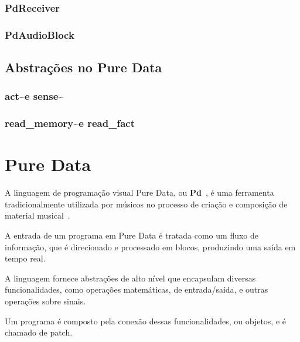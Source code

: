 \documentclass[a4paper, 11pt, twoside]{article}
\begin{document}
\begin{multicols}{2}
\subsubsection{PdReceiver}

\subsubsection{PdAudioBlock}

\subsection{Abstrações no Pure Data}

\subsubsection{act\textasciitilde e sense\textasciitilde}

\subsubsection{read\_memory\textasciitilde e read\_fact}

\section{Pure Data}

A linguagem de programação visual Pure Data, ou \textbf{Pd}~\cite{puckette97}, 
é uma ferramenta tradicionalmente utilizada por músicos no processo de criação
e composição de material musical~\cite{leandro11}. 

A entrada de um programa em Pure Data é tratada como
um fluxo de informação, que é direcionado e processado
em blocos, produzindo uma saída em tempo real.

A linguagem fornece abstrações de alto nível que encapsulam
diversas funcionalidades, como operações matemáticas,
de entrada/saída, e outras operações sobre sinais.

Um programa é composto pela conexão dessas
funcionalidades, ou objetos, e é chamado de patch.


\end{multicols}
\end{document}
